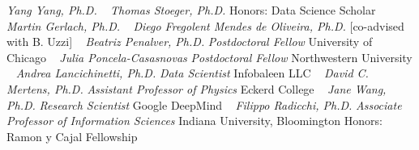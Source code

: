 \GapNoBreak
{}
\textit{Yang Yang, Ph.D.}
\newline
~
\Gap{}
\textit{Thomas Stoeger, Ph.D.}
\newline
    {\footnotesize Honors: Data Science Scholar}
    \newline
~
\Gap{}
\textit{Martin Gerlach, Ph.D.}
\newline
~
\Gap{}
\textit{Diego Fregolent Mendes de Oliveira, Ph.D.}
    [co-advised with B. Uzzi]
\newline
~
\Gap{}
\textit{Beatriz Penalver, Ph.D.}
\newline
    \textit{Postdoctoral Fellow}
    \newline
    University of Chicago
    \newline
~
\Gap{}
\textit{Julia Poncela-Casasnovas}
\newline
    \textit{Postdoctoral Fellow}
    \newline
    Northwestern University
    \newline
~
\Gap{}
\textit{Andrea Lancichinetti, Ph.D.}
\newline
    \textit{Data Scientist}
    \newline
    Infobaleen LLC
    \newline
~
\Gap{}
\textit{David C. Mertens, Ph.D.}
\newline
    \textit{Assistant Professor of Physics}
    \newline
    Eckerd College
    \newline
~
\Gap{}
\textit{Jane Wang, Ph.D.}
\newline
    \textit{Research Scientist}
    \newline
    Google DeepMind
    \newline
~
\Gap{}
\textit{Filippo Radicchi, Ph.D.}
\newline
    \textit{Associate Professor of Information Sciences}
    \newline
    Indiana University, Bloomington
    \newline
    {\footnotesize Honors: Ramon y Cajal Fellowship}
    \newline
